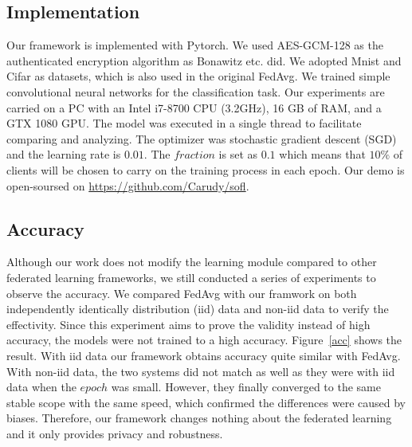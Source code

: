 \subsection{Implementation}
Our framework is implemented with Pytorch. We used AES-GCM-128 as the authenticated encryption algorithm as Bonawitz etc. did\cite{Practical}. We adopted Mnist and Cifar as datasets, which is also used in the original FedAvg\cite{mcmahan2016communicationefficient}. We trained simple convolutional neural networks for the classification task. Our experiments are carried on a PC with an Intel i7-8700 CPU (3.2GHz), 16 GB of RAM, and a GTX 1080 GPU. The model was executed in a single thread to facilitate comparing and analyzing. The optimizer was stochastic gradient descent (SGD) and the learning rate is $0.01$. The $fraction$ is set as $0.1$ which means that $10\%$ of clients will be chosen to carry on the training process in each epoch. Our demo is open-soursed on \url{https://github.com/Carudy/sofl}.


\subsection{Accuracy}
Although our work does not modify the learning module compared to other federated learning frameworks, we still conducted a series of experiments to observe the accuracy. We compared FedAvg with our framwork on both independently identically distribution (iid) data and non-iid data to verify the effectivity. Since this experiment aims to prove the validity instead of high accuracy, the models were not trained to a high accuracy. Figure~\ref{acc} shows the result. With iid data our framework obtains accuracy quite similar with FedAvg. With non-iid data, the two systems did not match as well as they were with iid data when the $epoch$ was small. However, they finally converged to the same stable scope with the same speed, which confirmed the differences were caused by biases. Therefore, our framework changes nothing about the federated learning and it only provides privacy and robustness. 

